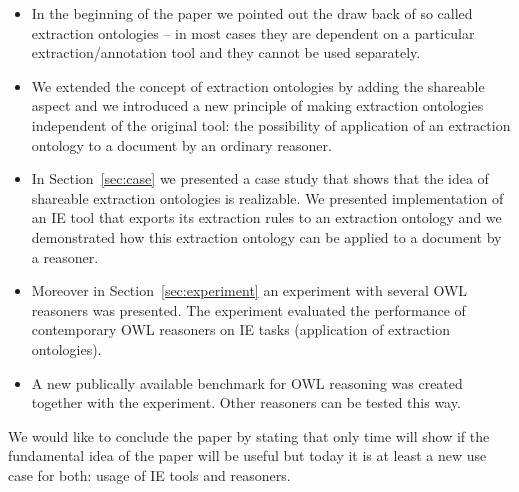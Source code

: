 \begin{itemize}
	\item In the beginning of the paper we pointed out the draw back of so called extraction ontologies -- in most cases they are dependent on a particular extraction/annotation tool and they cannot be used separately.	
	\item We extended the concept of extraction ontologies by adding the shareable aspect and we introduced a new principle of making extraction ontologies independent of the original tool: the possibility of application of an extraction ontology to a document by an ordinary reasoner.
	\item In Section~\ref{sec:case} we presented a case study that shows that the idea of shareable extraction ontologies is realizable. We presented implementation of an IE tool that exports its extraction rules to an extraction ontology and we demonstrated how this extraction ontology can be applied to a document by a reasoner.
	\item Moreover in Section~\ref{sec:experiment} an experiment with several OWL reasoners was presented. The experiment evaluated the performance of contemporary OWL reasoners on IE tasks (application of extraction ontologies).  
	\item A new publically available benchmark for OWL reasoning was created together with the experiment. Other reasoners can be tested this way.
\end{itemize}
   

We would like to conclude the paper by stating that only time will show if the fundamental idea of the paper will be useful but today it is at least a new use case for both: usage of IE tools and reasoners.
